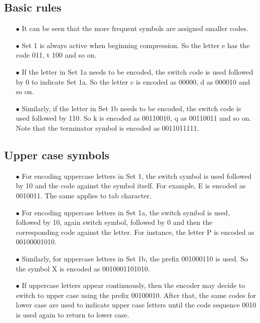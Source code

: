 \documentclass[]{article}
\begin{document}
\subsection{Basic rules}
\begin{itemize}
	\item[$\bullet$] It can be seen that the more frequent symbols are assigned smaller codes.
	\item[$\bullet$] Set 1 is always active when beginning compression.  So the letter e has the code 011, t 100 and so on.
	\item[$\bullet$] If the letter in Set 1a needs to be encoded, the switch code is used followed by 0 to indicate Set 1a.  So the letter c is encoded as 00000, d as 000010 and so on.
	\item[$\bullet$] Similarly, if the letter in Set 1b needs to be encoded, the switch code is used followed by 110. So k is encoded as 00110010, q as 00110011 and so on. Note that the terminator symbol is encoded as 0011011111.
\end{itemize}

\subsection{Upper case symbols}
\begin{itemize}
	\item[$\bullet$] For encoding uppercase letters in Set 1, the switch symbol is used followed by 10 and the code against the symbol itself.  For example, E is encoded as 0010011.  The same applies to tab character.
	\item[$\bullet$] For encoding uppercase letters in Set 1a, the switch symbol is used, followed by 10, again switch symbol, followed by 0 and then the corresponding code against the letter.  For instance, the letter P is encoded as 00100001010.
	\item[$\bullet$] Similarly, for uppercase letters in Set 1b, the prefix 001000110 is used.  So the symbol X is encoded as 0010001101010.
	\item[$\bullet$] If uppercase letters appear continuously, then the encoder may decide to switch to upper case using the prefix 00100010.  After that, the same codes for lower case are used to indicate upper case letters until the code sequence 0010 is used again to return to lower case.
\end{itemize}
\end{document}

